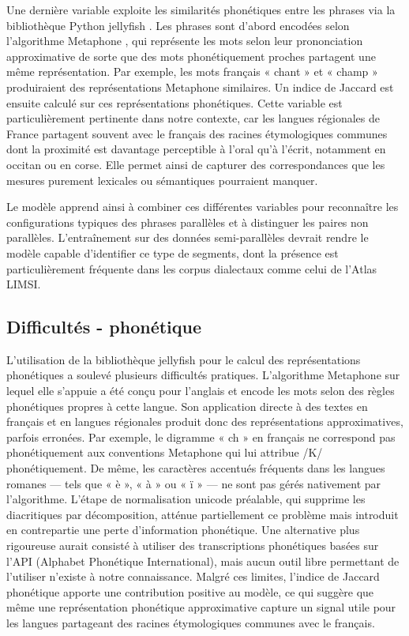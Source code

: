 Une dernière variable exploite les similarités phonétiques entre les phrases via la bibliothèque Python
jellyfish \citep{turk_2013}. Les phrases sont d'abord encodées selon l'algorithme Metaphone \citep{philips_1990},
qui représente les mots selon leur prononciation approximative de sorte que des mots phonétiquement proches
partagent une même représentation. Par exemple, les mots français {« }chant{ »} et {« }champ{ »} produiraient des
représentations Metaphone similaires. Un indice de Jaccard est ensuite calculé sur ces représentations
phonétiques. Cette variable est particulièrement pertinente dans notre contexte, car les langues régionales de
France partagent souvent avec le français des racines étymologiques communes dont la proximité est davantage
perceptible à l'oral qu'à l'écrit, notamment en occitan ou en corse. Elle permet ainsi de capturer des
correspondances que les mesures purement lexicales ou sémantiques pourraient manquer.

Le modèle apprend ainsi à combiner ces différentes variables pour reconnaître les configurations
typiques des phrases parallèles et à distinguer les paires non parallèles. L'entraînement sur des données
semi-parallèles devrait rendre le modèle capable d'identifier ce type de segments, dont la présence
est particulièrement fréquente dans les corpus dialectaux comme celui de l'Atlas LIMSI.

\subsection{Difficultés - phonétique}

L'utilisation de la bibliothèque jellyfish pour le calcul des représentations phonétiques a soulevé plusieurs difficultés pratiques.
L'algorithme Metaphone sur lequel elle s'appuie a été conçu pour l'anglais et encode les mots selon des règles phonétiques propres à cette langue.
Son application directe à des textes en français et en langues régionales produit donc des représentations approximatives, parfois
erronées. Par exemple,
le digramme {« }ch{ »} en français ne correspond pas phonétiquement aux conventions Metaphone qui lui attribue /K/ phonétiquement.
De même, les caractères accentués fréquents dans les langues romanes — tels que « è », « à » ou « ï » — ne sont pas gérés nativement par
l'algorithme. L'étape de normalisation unicode préalable, qui supprime les diacritiques par décomposition, atténue partiellement ce problème mais
introduit en contrepartie une perte d'information phonétique. Une alternative plus rigoureuse aurait consisté à utiliser des transcriptions
phonétiques basées sur l'API (Alphabet Phonétique International), mais aucun outil libre permettant de l'utiliser n'existe à notre connaissance.
Malgré ces limites, l'indice de Jaccard phonétique apporte une contribution
positive au modèle, ce qui suggère que même une représentation phonétique approximative capture un signal utile pour les langues partageant des
racines étymologiques communes avec le français.

